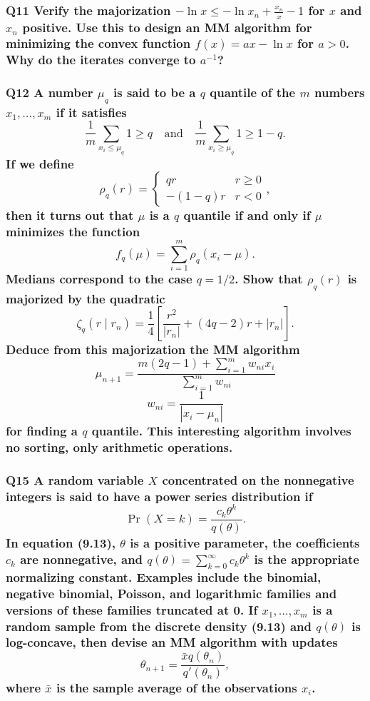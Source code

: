 \documentclass{article}
\begin{document}
\subsubsection*{Q11 Verify the majorization \(- \ln x \leq - \ln x_n + \frac{x_n}{x} - 1\) for \(x\) and \(x_n\) positive. Use this to design an MM algorithm for minimizing the convex function \(f(x) = ax - \ln x\) for \(a > 0\). Why do the iterates converge to \(a^{-1}\)?}

\subsubsection*{Q12 A number \(\mu_q\) is said to be a \(q\) quantile of the \(m\) numbers \(x_1, \ldots, x_m\) if it satisfies
\[
\frac{1}{m} \sum_{x_i \leq \mu_q} 1 \geq q \quad \text{and} \quad \frac{1}{m} \sum_{x_i \geq \mu_q} 1 \geq 1 - q.
\]
If we define
\[
\rho_q(r) = \begin{cases} 
qr & r \geq 0 \\ 
-(1 - q)r & r < 0 
\end{cases},
\]
then it turns out that \(\mu\) is a \(q\) quantile if and only if \(\mu\) minimizes the function
\[
f_q(\mu) = \sum_{i=1}^m \rho_q(x_i - \mu).
\]
Medians correspond to the case \(q = 1/2\). Show that \(\rho_q(r)\) is majorized by the quadratic
\[
\zeta_q(r \mid r_n) = \frac{1}{4} \left[ \frac{r^2}{|r_n|} + (4q - 2)r + |r_n| \right].
\]
Deduce from this majorization the MM algorithm
\[
\mu_{n+1} = \frac{m(2q - 1) + \sum_{i=1}^m w_{ni} x_i}{\sum_{i=1}^m w_{ni}}
\]
\[
w_{ni} = \frac{1}{|x_i - \mu_n|}
\]
for finding a \(q\) quantile. This interesting algorithm involves no sorting, only arithmetic operations.}

\subsubsection*{Q15 A random variable \(X\) concentrated on the nonnegative integers is said to have a power series distribution if
\[
\Pr(X = k) = \frac{c_k \theta^k}{q(\theta)}.
\]
In equation (9.13), \(\theta\) is a positive parameter, the coefficients \(c_k\) are nonnegative, and \(q(\theta) = \sum_{k=0}^\infty c_k \theta^k\) is the appropriate normalizing constant. Examples include the binomial, negative binomial, Poisson, and logarithmic families and versions of these families truncated at 0. If \(x_1, \ldots, x_m\) is a random sample from the discrete density (9.13) and \(q(\theta)\) is log-concave, then devise an MM algorithm with updates
\[
\theta_{n+1} = \frac{\bar{x} q(\theta_n)}{q'(\theta_n)},
\]
where \(\bar{x}\) is the sample average of the observations \(x_i\).}
\end{document}
